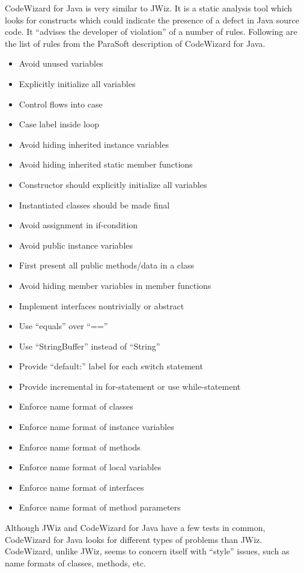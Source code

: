 CodeWizard for Java is very similar to JWiz.  It is a static analysis tool
which looks for constructs which could indicate the presence of a defect in
Java source code.  It ``advises the developer of
violation''\cite{CodeWizard97} of a number of rules.  Following are the
list of rules from the ParaSoft description of CodeWizard for
Java\cite{CodeWizard97}.

\begin{itemize}
\item Avoid unused variables
\item Explicitly initialize all variables
\item Control flows into case
\item Case label inside loop
\item Avoid hiding inherited instance variables
\item Avoid hiding inherited static member functions
\item Constructor should explicitly initialize all variables
\item Instantiated classes should be made final
\item Avoid assignment in if-condition
\item Avoid public instance variables
\item First present all public methods/data in a class
\item Avoid hiding member variables in member functions
\item Implement interfaces nontrivially or abstract
\item Use ``equals'' over ``==''
\item Use ``StringBuffer'' instead of ``String''
\item Provide ``default:'' label for each switch statement
\item Provide incremental in for-statement or use while-statement
\item Enforce name format of classes
\item Enforce name format of instance variables
\item Enforce name format of methods
\item Enforce name format of local variables
\item Enforce name format of interfaces
\item Enforce name format of method parameters
\end{itemize}

Although JWiz and CodeWizard for Java have a few tests in common,
CodeWizard for Java looks for different types of problems than JWiz.
CodeWizard, unlike JWiz, seems to concern itself with ``style'' issues,
such as name formats of classes, methods, etc.

